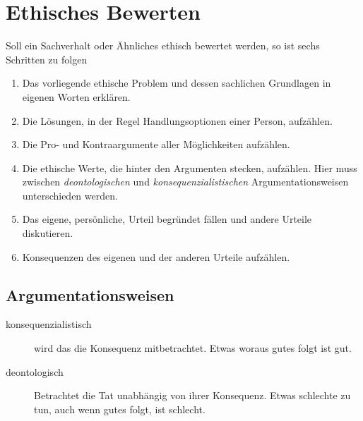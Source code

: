 \documentclass{article}
\begin{document}
\section{Ethisches Bewerten}
Soll ein Sachverhalt oder Ähnliches ethisch bewertet werden, so ist sechs Schritten zu folgen
\begin{enumerate}
 \item Das vorliegende ethische Problem und dessen sachlichen Grundlagen in eigenen Worten erklären.
 \item Die Lösungen, in der Regel Handlungsoptionen einer Person, aufzählen.
 \item Die Pro- und Kontraargumente aller Möglichkeiten aufzählen.
 \item Die ethische Werte, die hinter den Argumenten stecken, aufzählen. Hier muss zwischen \emph{deontologischen} und \emph{konsequenzialistischen} Argumentationsweisen unterschieden werden.
 \item Das eigene, persönliche, Urteil begründet fällen und andere Urteile diskutieren.
 \item Konsequenzen des eigenen und der anderen Urteile aufzählen.
\end{enumerate} 
 
\subsection{Argumentationsweisen}
\begin{description}
 \item[konsequenzialistisch] wird das die Konsequenz mitbetrachtet. Etwas woraus gutes folgt ist gut.
 \item[deontologisch] Betrachtet die Tat unabhängig von ihrer Konsequenz. Etwas schlechte zu tun, auch wenn gutes folgt, ist schlecht.
\end{description} 
\end{document}
